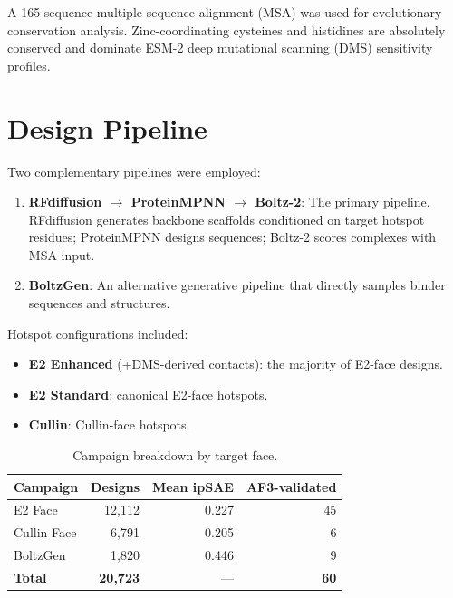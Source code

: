 \documentclass[11pt,a4paper]{article}
\begin{document}
A 165-sequence multiple sequence alignment (MSA) was used for evolutionary conservation analysis. Zinc-coordinating cysteines and histidines are absolutely conserved and dominate ESM-2 deep mutational scanning (DMS) sensitivity profiles.

\section{Design Pipeline}

Two complementary pipelines were employed:

\begin{enumerate}
  \item \textbf{RFdiffusion $\rightarrow$ ProteinMPNN $\rightarrow$ Boltz-2}: The primary pipeline. RFdiffusion generates backbone scaffolds conditioned on target hotspot residues; ProteinMPNN designs sequences; Boltz-2 scores complexes with MSA input.
  \item \textbf{BoltzGen}: An alternative generative pipeline that directly samples binder sequences and structures.
\end{enumerate}

Hotspot configurations included:
\begin{itemize}
  \item \textbf{E2 Enhanced} (+DMS-derived contacts): the majority of E2-face designs.
  \item \textbf{E2 Standard}: canonical E2-face hotspots.
  \item \textbf{Cullin}: Cullin-face hotspots.
\end{itemize}

\begin{table}[H]
\centering
\caption{Campaign breakdown by target face.}
\label{tab:campaigns}
\begin{tabular}{lrrr}
\toprule
\textbf{Campaign} & \textbf{Designs} & \textbf{Mean ipSAE} & \textbf{AF3-validated} \\
\midrule
E2 Face     & 12,112 & 0.227 & 45 \\
Cullin Face &  6,791 & 0.205 &  6 \\
BoltzGen    &  1,820 & 0.446 &  9 \\
\midrule
\textbf{Total} & \textbf{20,723} & --- & \textbf{60} \\
\bottomrule
\end{tabular}
\end{table}
\end{document}
